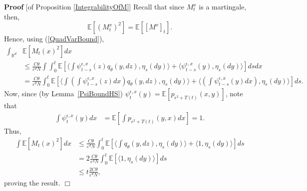 \documentclass[12pt]{article}
\newenvironment {proof}{{\noindent\bf Proof }}{\hfill $\Box$ \medskip}
\newcommand{\IE}{\mathbb E}
\newcommand{\IR}{\mathbb R}
\begin{document}
\begin{proof}[of Proposition \ref{IntegrabilityOfM}]
    Recall that since $M^x_t$ is a martingale, then,
    \[
        \IE\left[ (M_t^x)^2 \right] = \IE\left[ [M^x]_t \right].
    \]
    Hence, using (\ref{QuadVarBound}),
    \begin{align*}
        \int_{\IR^d} &\IE\left[ M_t(x)^2 \right] dx
        \\ & \leq
        \frac{C \theta}{\varepsilon^d N} \int \int_0^t
            \IE\left[ \langle \int \psi_{t-s}^{\epsilon,x}(z) q_\theta(y,dz), \eta_s(dy) \rangle
                + \langle \psi_{t-s}^{\epsilon,x}(y),
            \eta_s(dy)\rangle \right]
        ds dx
        \\ &= 
        \frac{C \theta}{\varepsilon^d N} \int_0^t \IE \left[
            \langle \int \left( \int \psi_{t-s}^{\epsilon,x}(z) dx \right) q_\theta(y,dz),
            \eta_s(dy) \rangle
            +
            \langle \left( \int \psi_{t-s}^{\epsilon,x}(y) dx \right), \eta_s(dy)\rangle
        \right] ds.
    \end{align*}
    Now, since (by Lemma~\ref{PsiBoundHS}) $\psi_t^{\epsilon, x}(y) = \IE[p_{\epsilon^2+T(t)}(x,y)]$,
    note that
    \begin{align*}
        \int
            \psi_t^{\epsilon, x}(y) dx
            & =
            \IE\left[ \int p_{\epsilon^2+T(t)}(y,x) dx \right]
            = 1.
    \end{align*}
    Thus,
    \begin{align*}
    \int \IE\left[ M_t(x)^2 \right] dx
        & \leq 
        \frac{C \theta}{\varepsilon^d N} 
        \int_0^t \IE \left[ 
            \langle \int  q_\theta(y,dz), \eta_s(dy) \rangle
            +
            \langle 1, \eta_s(dy)\rangle
        \right] ds
        \\ & =
        2 \frac{C \theta}{\varepsilon^d N}
        \int_0^t \IE[ \langle 1, \eta_s(dy) \rangle ] ds
        \\ & \leq
        t \frac{2 C \theta}{ \varepsilon^d N} ,
    \end{align*}
    proving the result.
\end{proof}

\end{document}
